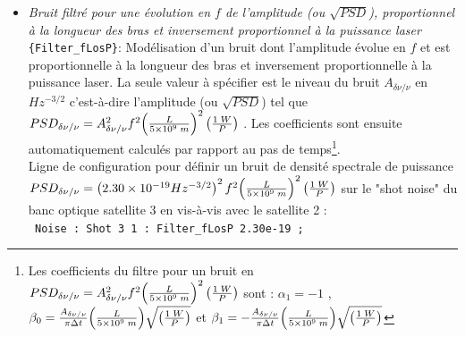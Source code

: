 \documentclass[a4paper,english,12pt]{article}
\begin{document}
\begin{itemize}
\item { \it Bruit filtr\'e pour une \'evolution en $f$ de l'amplitude (ou $\sqrt{PSD}$), proportionnel \`a la longueur des bras et inversement proportionnel \`a la puissance laser} \texttt{\{Filter\_fLosP\}}: Mod\'elisation d'un bruit dont l'amplitude \'evolue en $f$ et est proportionnelle \`a la longueur des bras et inversement proportionnelle \`a la puissance laser. La seule valeur \`a sp\'ecifier est le niveau du bruit $A_{\delta \nu / \nu}$  en $Hz^{-3/2}$ c'est-\`a-dire l'amplitude (ou $\sqrt{PSD}$) tel que $PSD_{\delta \nu / \nu} = A^2_{\delta \nu / \nu} f^{2} {\left(L \over 5\times10^{9} \;m \right)}^2 \left(1 \; W \over P \right)$ . Les coefficients sont ensuite automatiquement calcul\'es par rapport au pas de temps\footnote{Les coefficients du filtre pour un bruit en  $PSD_{\delta \nu / \nu} = A^2_{\delta \nu / \nu} f^{2} {\left(L \over 5\times10^{9} \;m \right)}^2 \left(1 \; W \over P \right)$ sont : $\alpha_{1} = -1$ , $\beta_{0} = {A_{\delta \nu / \nu} \over \pi \Delta t}  {\left(L \over 5\times10^{9} \;m \right)} \sqrt{\left(1 \; W \over P \right)} $ et  $\beta_{1} = - {A_{\delta \nu / \nu} \over \pi \Delta t}  {\left(L \over 5\times10^{9} \;m \right)} \sqrt{\left(1 \; W \over P \right)} $ }.\\
Ligne de configuration pour d\'efinir un bruit de densit\'e spectrale de puissance $PSD_{\delta \nu / \nu} = \left( 2.30 \times 10^{-19} Hz^{-3/2}\right)^2 f^{2} {\left(L \over 5\times10^{9} \;m \right)}^2 \left(1 \; W \over P \right)$ sur le "shot noise" du banc optique satellite 3 en vis-\`a-vis avec le satellite 2 : \\
\hphantom{aaaaa}\texttt{ Noise : Shot 3 1 : Filter\_fLosP 2.30e-19 ;} \\


\end{itemize}
\end{document}
